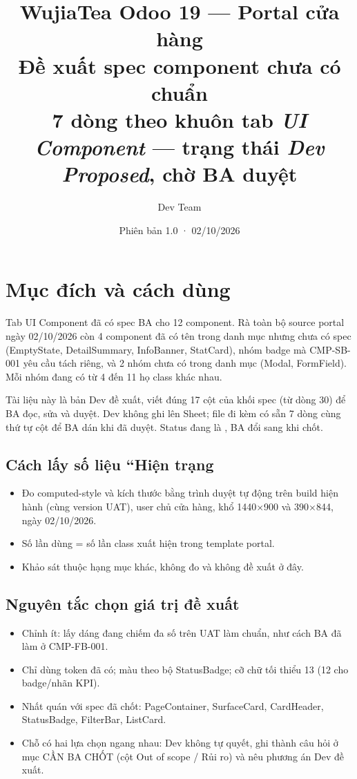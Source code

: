 \documentclass[11pt,a4paper]{report}
\title{\vspace{1cm}\textbf{WujiaTea Odoo 19 --- Portal cửa hàng}\\[0.3cm]\Large Đề xuất spec component chưa có chuẩn\\[0.2cm]\large 7 dòng theo khuôn tab \textit{UI Component} --- trạng thái \textit{Dev Proposed}, chờ BA duyệt}
\author{Dev Team}
\date{Phiên bản 1.0 · 02/10/2026}
\newcommand{\codesp}[1]{\texttt{\detokenize{#1}}}
\begin{document}
\maketitle
\tableofcontents

\chapter{Mục đích và cách dùng}
Tab UI Component đã có spec BA cho 12 component. Rà toàn bộ source portal ngày 02/\allowbreak{}10/\allowbreak{}2026 còn 4 component đã có tên trong danh mục nhưng chưa có spec (EmptyState, DetailSummary, InfoBanner, StatCard), nhóm badge mà CMP-SB-001 yêu cầu tách riêng, và 2 nhóm chưa có trong danh mục (Modal, FormField). Mỗi nhóm đang có từ 4 đến 11 họ class khác nhau.\par
Tài liệu này là bản Dev đề xuất, viết đúng 17 cột của khối spec (từ dòng 30) để BA đọc, sửa và duyệt. Dev không ghi lên Sheet; file  đi kèm có sẵn 7 dòng cùng thứ tự cột để BA dán khi đã duyệt. Status đang là \codesp{Dev Proposed}, BA đổi sang \codesp{BA Confirmed} khi chốt.\par
\section*{Cách lấy số liệu ``Hiện trạng}
\begin{itemize}
\item Đo computed-\allowbreak{}style và kích thước bằng trình duyệt tự động trên build hiện hành (cùng version UAT), user chủ cửa hàng, khổ 1440\(\times\)900 và 390\(\times\)844, ngày 02/\allowbreak{}10/\allowbreak{}2026.
\item Số lần dùng = số lần class xuất hiện trong template portal.
\item Khảo sát thuộc hạng mục khác, không đo và không đề xuất ở đây.
\end{itemize}
\section*{Nguyên tắc chọn giá trị đề xuất}
\begin{itemize}
\item Chỉnh ít: lấy dáng đang chiếm đa số trên UAT làm chuẩn, như cách BA đã làm ở CMP-FB-001.
\item Chỉ dùng token đã có; màu theo bộ StatusBadge; cỡ chữ tối thiểu 13 (12 cho badge/\allowbreak{}nhãn KPI).
\item Nhất quán với spec đã chốt: PageContainer, SurfaceCard, CardHeader, StatusBadge, FilterBar, ListCard.
\item Chỗ có hai lựa chọn ngang nhau: Dev không tự quyết, ghi thành câu hỏi ở mục CẦN BA CHỐT (cột Out of scope / Rủi ro) và nêu phương án Dev đề xuất.
\end{itemize}
\end{document}
